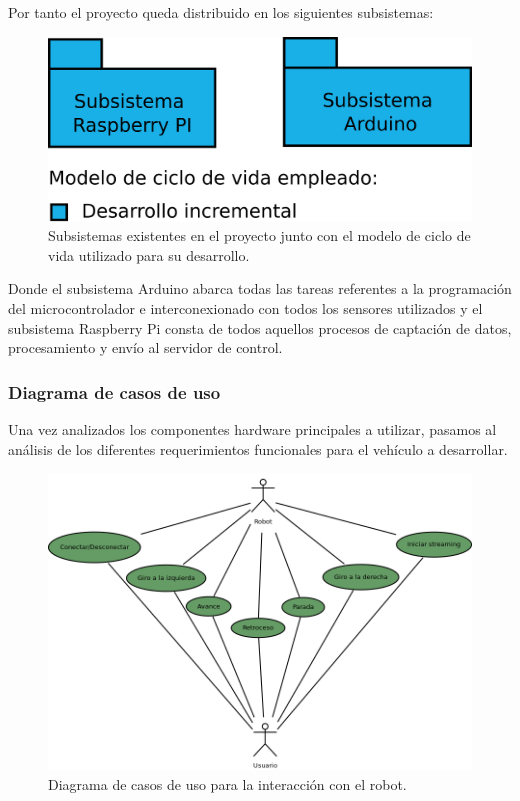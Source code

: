 Por tanto el proyecto queda distribuido en los siguientes subsistemas:\\

\begin{figure}[H]
  \begin{center}
    \includegraphics[scale=0.03]{diagramas/subsistemas.png}
  \end{center}
  \caption{Subsistemas existentes en el proyecto junto con el modelo de ciclo de vida
utilizado para su desarrollo.}
  \label{diagrama:subsistemas}
\end{figure}

Donde el subsistema Arduino abarca todas las tareas referentes a la programación del microcontrolador e interconexionado con todos los sensores utilizados y el subsistema Raspberry Pi
consta de todos aquellos procesos de captación de datos, procesamiento y envío al servidor de control.\\

\subsubsection{Diagrama de casos de uso}

Una vez analizados los componentes hardware principales a utilizar, pasamos al análisis de los diferentes requerimientos funcionales para el vehículo a desarrollar.

\begin{figure}[H]
  \begin{center}
    \includegraphics[scale=.4]{diagramas/casos-uso-robot.png}
  \end{center}
  \caption{Diagrama de casos de uso para la interacción con el robot.}
  \label{diagram:caso-uso}
\end{figure}

